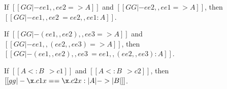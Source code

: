 \begin{corollary} \label{lemma:commu}
  If $[[GG |- ee1 ,, ee2 => A ]]$ and $[[GG |- ee2 ,, ee1 => A ]]$, then
  $[[GG |- ee1 ,, ee2 ~= ee2 ,, ee1 : A]]$.
\end{corollary}


\begin{corollary} \label{lemma:assoc}
  If $[[GG |- (ee1 ,, ee2) ,, ee3 => A  ]]$ and $[[GG |- ee1 ,, (ee2 ,, ee3) => A ]]$, then
  $[[GG |- (ee1 ,, ee2) ,, ee3 ~= ee1 ,, (ee2 ,, ee3) : A]]$.
\end{corollary}



\begin{corollary}
  \label{lemma:coercion_same}
  If $[[A <: B ~~> c1]]$ and $[[A <: B ~~> c2]]$, then $[[gg |- \x . c1 x == \x . c2 x : | A | -> | B |]]$.
\end{corollary}


